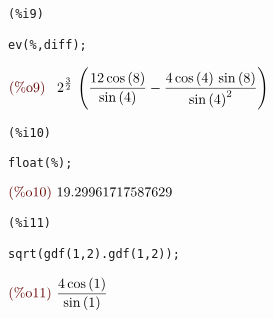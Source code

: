 \documentclass[12pt]{article}
\begin{document}
\noindent
\begin{minipage}[t]{8ex}{\color{red}\bf
\begin{verbatim}
(%i9) 
\end{verbatim}}
\end{minipage}
\begin{minipage}[t]{\textwidth}{\color{blue}
\begin{verbatim}
ev(%,diff);
\end{verbatim}}
\end{minipage}
\begin{math}\displaystyle
\parbox{8ex}{\color{labelcolor}(\%o9) }
{2}^{\frac{3}{2}}\,\left( \frac{12\,\mathrm{cos}\left( 8\right) }{\mathrm{sin}\left( 4\right) }-\frac{4\,\mathrm{cos}\left( 4\right) \,\mathrm{sin}\left( 8\right) }{{\mathrm{sin}\left( 4\right) }^{2}}\right) 
\end{math}


\noindent
\begin{minipage}[t]{8ex}{\color{red}\bf
\begin{verbatim}
(%i10) 
\end{verbatim}}
\end{minipage}
\begin{minipage}[t]{\textwidth}{\color{blue}
\begin{verbatim}
float(%);
\end{verbatim}}
\end{minipage}
\begin{math}\displaystyle
\parbox{8ex}{\color{labelcolor}(\%o10) }
19.29961717587629
\end{math}


\noindent
\begin{minipage}[t]{8ex}{\color{red}\bf
\begin{verbatim}
(%i11) 
\end{verbatim}}
\end{minipage}
\begin{minipage}[t]{\textwidth}{\color{blue}
\begin{verbatim}
sqrt(gdf(1,2).gdf(1,2));
\end{verbatim}}
\end{minipage}
\begin{math}\displaystyle
\parbox{8ex}{\color{labelcolor}(\%o11) }
\frac{4\,\mathrm{cos}\left( 1\right) }{\mathrm{sin}\left( 1\right) }
\end{math}
\end{document}
